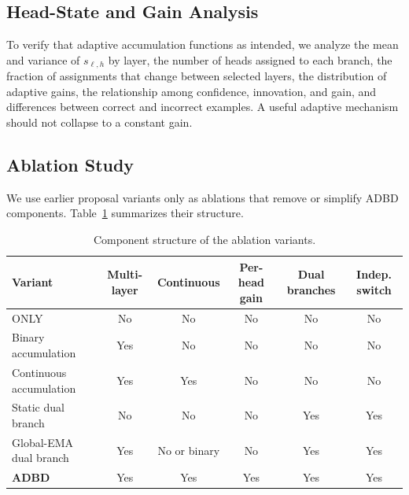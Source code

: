 \subsection{Head-State and Gain Analysis}

To verify that adaptive accumulation functions as intended, we analyze the mean and variance of $s_{\ell,h}$ by layer, the number of heads assigned to each branch, the fraction of assignments that change between selected layers, the distribution of adaptive gains, the relationship among confidence, innovation, and gain, and differences between correct and incorrect examples. A useful adaptive mechanism should not collapse to a constant gain. 

\subsection{Ablation Study}
\label{subsec:ablations}

We use earlier proposal variants only as ablations that remove or simplify ADBD components. Table~\ref{tab:ablation_design} summarizes their structure.

\begin{table}[t]
\centering
\small
\setlength{\tabcolsep}{4pt}
\begin{tabular}{lccccc}
\toprule
Variant & Multi-layer & Continuous & Per-head gain & Dual branches & Indep. switch \\
\midrule
ONLY                    & No  & No  & No  & No  & No \\
Binary accumulation     & Yes & No  & No  & No  & No \\
Continuous accumulation & Yes & Yes & No  & No  & No \\
Static dual branch      & No  & No  & No  & Yes & Yes \\
Global-EMA dual branch  & Yes & No or binary & No & Yes & Yes \\
\textbf{ADBD}           & Yes & Yes & Yes & Yes & Yes \\
\bottomrule
\end{tabular}
\caption{Component structure of the ablation variants.}
\label{tab:ablation_design}
\end{table}

